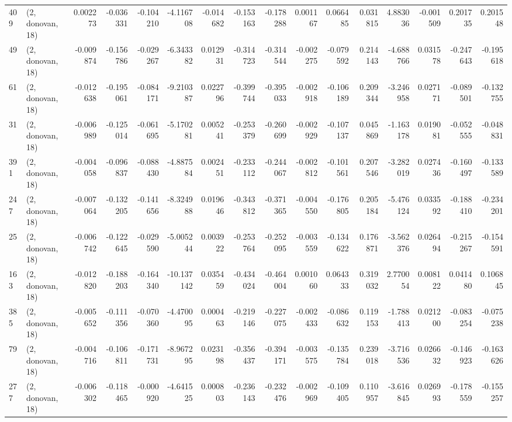 \begin{tabular}{llrrrrrrrrrrrrrr}
409 &  (2, donovan, 18) &   0.002273 & -0.036331 & -0.104210 &   -4.116708 & -0.014682 &  -0.153163 & -0.178288 &  0.001167 &  0.066485 &  0.031815 &    4.883036 & -0.001509 &  0.201735 &  0.201548 \\
49  &  (2, donovan, 18) &  -0.009874 & -0.156786 & -0.029267 &   -6.343382 &  0.012931 &  -0.314723 & -0.314544 & -0.002275 & -0.079592 &  0.214143 &   -4.688766 &  0.031578 & -0.247643 & -0.195618 \\
61  &  (2, donovan, 18) &  -0.012638 & -0.195061 & -0.084171 &   -9.210387 &  0.022796 &  -0.399744 & -0.395033 & -0.002918 & -0.106189 &  0.209344 &   -3.246958 &  0.027171 & -0.089501 & -0.132755 \\
31  &  (2, donovan, 18) &  -0.006989 & -0.125014 & -0.061695 &   -5.170281 &  0.005241 &  -0.253379 & -0.260699 & -0.002929 & -0.107137 &  0.045869 &   -1.163178 &  0.019081 & -0.052555 & -0.048831 \\
391 &  (2, donovan, 18) &  -0.004058 & -0.096837 & -0.088430 &   -4.887584 &  0.002451 &  -0.233112 & -0.244067 & -0.002812 & -0.101561 &  0.207546 &   -3.282019 &  0.027436 & -0.160497 & -0.133589 \\
247 &  (2, donovan, 18) &  -0.007064 & -0.132205 & -0.141656 &   -8.324988 &  0.019646 &  -0.343812 & -0.371365 & -0.004550 & -0.176805 &  0.205184 &   -5.476124 &  0.033592 & -0.188410 & -0.234201 \\
25  &  (2, donovan, 18) &  -0.006742 & -0.122645 & -0.029590 &   -5.005244 &  0.003922 &  -0.253764 & -0.252095 & -0.003559 & -0.134622 &  0.176871 &   -3.562376 &  0.026494 & -0.215267 & -0.154591 \\
163 &  (2, donovan, 18) &  -0.012820 & -0.188203 & -0.164340 &  -10.137142 &  0.035459 &  -0.434024 & -0.464004 &  0.001060 &  0.064333 &  0.319032 &    2.770054 &  0.008122 &  0.041480 &  0.106845 \\
385 &  (2, donovan, 18) &  -0.005652 & -0.111356 & -0.070360 &   -4.470095 &  0.000463 &  -0.219146 & -0.227075 & -0.002433 & -0.086632 &  0.119153 &   -1.788413 &  0.021200 & -0.083254 & -0.075238 \\
79  &  (2, donovan, 18) &  -0.004716 & -0.106811 & -0.171731 &   -8.967295 &  0.023198 &  -0.356437 & -0.394171 & -0.003575 & -0.135784 &  0.239018 &   -3.716536 &  0.026632 & -0.146923 & -0.163626 \\
277 &  (2, donovan, 18) &  -0.006302 & -0.118465 & -0.000920 &   -4.641525 &  0.000803 &  -0.236143 & -0.232476 & -0.002969 & -0.109405 &  0.110957 &   -3.616845 &  0.026993 & -0.178559 & -0.155257 \\

\end{tabular}
